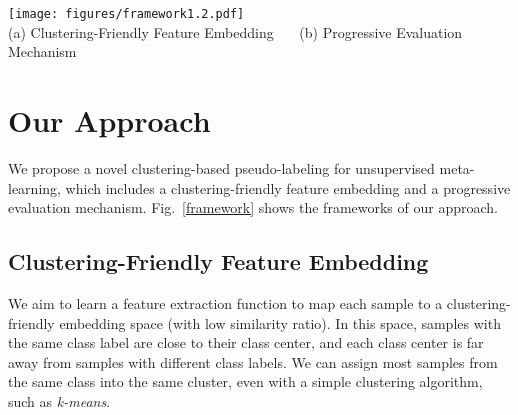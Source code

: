 \documentclass[runningheads]{llncs}
\begin{document}
\begin{figure*}[t]
	
	\centering
	\texttt{[image: figures/framework1.2.pdf]}\\
	(a) Clustering-Friendly Feature Embedding  ~~~(b) Progressive Evaluation Mechanism
\caption{
		\textbf{The frameworks of our clustering-friendly feature embedding and progressive evaluation mechanism.} \textbf{(a) The embedding feature extraction.} We first augment the samples in one mini-batch and feed them into the asynchronous embedding models to build a positive set. We also use the negative set storing the historical embedding features to obtain more varied features. Then we update our main embedding model (green) with backpropagation (green arrows), by minimizing the similarity ratio between the average features (purple ellipses), and the features in the positive and negative sets. The historical encoder is momentum updated with the main model. \textbf{(b) The progressive evaluation mechanism.} We randomly select  clusters as base clusters (), and choose the -nearest neighbors as the candidates. Then, we use an evaluation model to select the clusters () with the highest entropy and filter out noisy samples.
		\vspace{-2mm}
	}
	\vspace{-2mm}
	\label{framework}
\end{figure*}

\section{Our Approach}
We propose a novel clustering-based pseudo-labeling for unsupervised meta-learning, which includes a clustering-friendly feature embedding and a progressive evaluation mechanism.
Fig.~\ref{framework} shows the frameworks of our approach.
\subsection{Clustering-Friendly Feature Embedding}\label{sec:CF-embedding}
 We aim to learn a feature extraction function to map each sample to a clustering-friendly embedding space (with low similarity ratio). In this space, samples with the same class label are close to their class center, and each class center is far away from samples with different class labels. We can assign most samples from the same class into the same cluster, even with a simple clustering algorithm, such as \textit{k-means}. 
\end{document}
